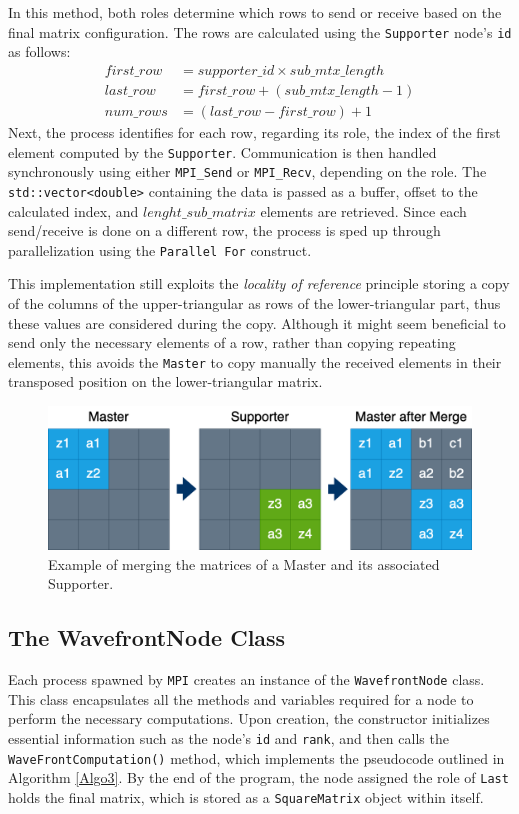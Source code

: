 \par In this method, both roles determine which rows to send or receive based on the final matrix configuration. The rows are calculated using the \texttt{Supporter} node's \texttt{id} as follows:
\begin{align*}
    first\_row &= supporter\_id \times sub\_mtx\_length \\
    last\_row &= first\_row + (sub\_mtx\_length - 1) \\
    num\_rows &= (last\_row - first\_row) + 1
\end{align*}
Next, the process identifies for each row, regarding its role, the index of the first element computed by the \texttt{Supporter}. Communication is then handled synchronously using either \texttt{MPI\_Send} or \texttt{MPI\_Recv}, depending on the role. The \texttt{std::vector<double>} containing the data is passed as a buffer, offset to the calculated index, and $lenght\_sub\_matrix$ elements are retrieved. Since each send/receive is done on a different row, the process is sped up through parallelization using the \texttt{Parallel For} construct.

This implementation still exploits the \textit{locality of reference} principle storing a copy of the columns of the upper-triangular as rows of the lower-triangular part, thus these values are considered during the copy. Although it might seem beneficial to send only the necessary elements of a row, rather than copying repeating elements, this avoids the \texttt{Master} to copy manually the received elements in their transposed position on the lower-triangular matrix. 

\begin{figure}[h]
    \centering\includegraphics[scale=0.25]{img/MPI/MergeMatrix.drawio.png}
    
    \caption{Example of merging the matrices of a Master and its associated Supporter.}
\end{figure}

\subsection*{The WavefrontNode Class}
Each process spawned by \texttt{MPI} creates an instance of the \texttt{WavefrontNode} class. This class encapsulates all the methods and variables required for a node to perform the necessary computations. Upon creation, the constructor initializes essential information such as the node's \texttt{id} and \texttt{rank}, and then calls the \texttt{WaveFrontComputation()} method, which implements the pseudocode outlined in Algorithm \ref{Algo3}. By the end of the program, the node assigned the role of \texttt{Last} holds the final matrix, which is stored as a \texttt{SquareMatrix} object within itself.

